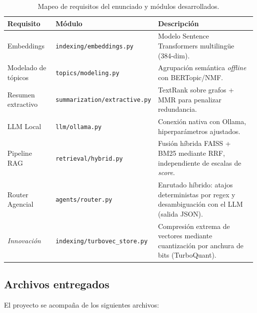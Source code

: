 \documentclass[11pt,a4paper]{article}
\newcommand{\code}[1]{\texttt{#1}}
\providecommand{\DIFdeltex}[1]{} %
\providecommand{\DIFdelbegin}{} %
\providecommand{\DIFdelend}{} %
\providecommand{\DIFdel}[1]{\texorpdfstring{\DIFdeltex{#1}}{}} %
\newcommand{\DIFscaledelfig}{0.5}
\newlength{\DIFdelgraphicswidth} %
\newlength{\DIFdelgraphicsheight} %
\newcommand{\DIFdelincludegraphics}[2][]{%
\sbox{\DIFdelgraphicsbox}{\DIFOincludegraphics[#1]{#2}}%
\settoboxwidth{\DIFdelgraphicswidth}{\DIFdelgraphicsbox} %
\settoboxtotalheight{\DIFdelgraphicsheight}{\DIFdelgraphicsbox} %
\scalebox{\DIFscaledelfig}{%
\parbox[b]{\DIFdelgraphicswidth}{\usebox{\DIFdelgraphicsbox}\\[-\baselineskip] \rule{\DIFdelgraphicswidth}{0em}}\llap{\resizebox{\DIFdelgraphicswidth}{\DIFdelgraphicsheight}{%
\setlength{\unitlength}{\DIFdelgraphicswidth}%
\begin{picture}(1,1)%
\thicklines\linethickness{2pt} %
{\color[rgb]{1,0,0}\put(0,0){\framebox(1,1){}}}%
{\color[rgb]{1,0,0}\put(0,0){\line( 1,1){1}}}%
{\color[rgb]{1,0,0}\put(0,1){\line(1,-1){1}}}%
\end{picture}%
}\hspace*{3pt}}} %
} %
\DeclareRobustCommand{\DIFdelbegin}{\DIFOdelbegin \let\includegraphics\DIFdelincludegraphics} %
\DeclareRobustCommand{\DIFdelend}{\DIFOaddend \let\includegraphics\DIFOincludegraphics} %
\begin{document}
\begin{table}[htbp]
\centering
\small
{}
\begin{tabularx}{\textwidth}{l l X}
\toprule
\rowcolor{tabheader} \textbf{Requisito} & \textbf{Módulo} & \textbf{Descripción} \\
\midrule
Embeddings & \code{indexing/embeddings.py} & Modelo Sentence Transformers multilingüe (384-dim). \\
Modelado de tópicos & \code{topics/modeling.py} & Agrupación semántica \textit{offline} con BERTopic/NMF. \\
Resumen extractivo & \code{summarization/extractive.py} & TextRank sobre grafos + MMR para penalizar redundancia. \\
LLM Local & \code{llm/ollama.py} & Conexión nativa con Ollama, hiperparámetros ajustados. \\
Pipeline RAG & \code{retrieval/hybrid.py} & Fusión híbrida FAISS + BM25 mediante RRF, independiente de escalas de \textit{score}. \\
Router Agencial & \code{agents/router.py} & Enrutado híbrido: atajos deterministas por regex y desambiguación con el LLM (salida JSON). \\
\midrule
\textit{Innovación} & \code{indexing/turbovec\_store.py} & Compresión extrema de vectores mediante cuantización por anchura de bits (TurboQuant). \\
\bottomrule
\end{tabularx}
\caption{Mapeo de requisitos del enunciado y módulos desarrollados.}
\end{table}

\newpage
\subsection{Archivos entregados}

El proyecto se acompaña de los siguientes archivos\DIFdelbegin \DIFdel{, listos para su ejecución y auditoría}\DIFdelend :
\end{document}
